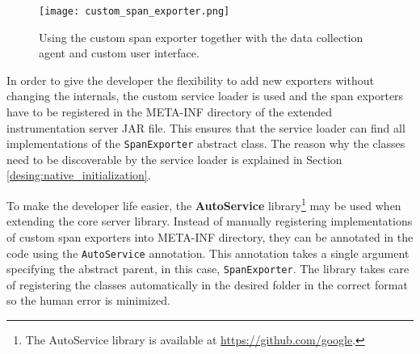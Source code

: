 \begin{figure}
	\centering
	\texttt{[image: custom\_span\_exporter.png]}
	\caption{Using the custom span exporter together with the data collection agent and custom user interface.}
	\label{fig:custom_span_exporter}
\end{figure}

In order to give the developer the flexibility to add new exporters without changing the internals, the custom service loader is used and the span exporters have to be registered in the META-INF directory of the extended instrumentation server JAR file. This ensures that the service loader can find all implementations of the \texttt{SpanExporter} abstract class. The reason why the classes need to be discoverable by the service loader is explained in Section \ref{desing:native_initialization}.

To make the developer life easier, the \textbf{AutoService} library\footnote{The AutoService library is available at \url{https://github.com/google}.} may be used when extending the core server library. Instead of manually registering implementations of custom span exporters into META-INF directory, they can be annotated in the code using the \texttt{AutoService} annotation. This annotation takes a single argument specifying the abstract parent, in this case, \texttt{SpanExporter}. The library takes care of registering the classes automatically in the desired folder in the correct format so the human error is minimized.

